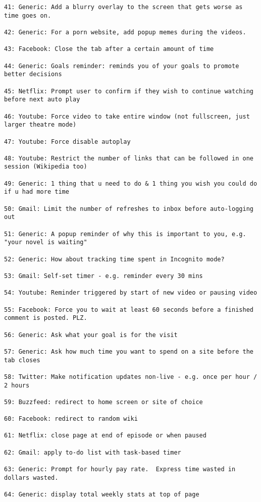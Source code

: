 \begin{lstlisting}[breaklines]
41: Generic: Add a blurry overlay to the screen that gets worse as time goes on.

42: Generic: For a porn website, add popup memes during the videos.

43: Facebook: Close the tab after a certain amount of time

44: Generic: Goals reminder: reminds you of your goals to promote better decisions

45: Netflix: Prompt user to confirm if they wish to continue watching before next auto play

46: Youtube: Force video to take entire window (not fullscreen, just larger theatre mode)

47: Youtube: Force disable autoplay

48: Youtube: Restrict the number of links that can be followed in one session (Wikipedia too)

49: Generic: 1 thing that u need to do & 1 thing you wish you could do if u had more time

50: Gmail: Limit the number of refreshes to inbox before auto-logging out

51: Generic: A popup reminder of why this is important to you, e.g. "your novel is waiting"

52: Generic: How about tracking time spent in Incognito mode?

53: Gmail: Self-set timer - e.g. reminder every 30 mins

54: Youtube: Reminder triggered by start of new video or pausing video

55: Facebook: Force you to wait at least 60 seconds before a finished comment is posted. PLZ.

56: Generic: Ask what your goal is for the visit

57: Generic: Ask how much time you want to spend on a site before the tab closes

58: Twitter: Make notification updates non-live - e.g. once per hour / 2 hours

59: Buzzfeed: redirect to home screen or site of choice

60: Facebook: redirect to random wiki

61: Netflix: close page at end of episode or when paused

62: Gmail: apply to-do list with task-based timer

63: Generic: Prompt for hourly pay rate.  Express time wasted in dollars wasted.

64: Generic: display total weekly stats at top of page


\end{lstlisting}
